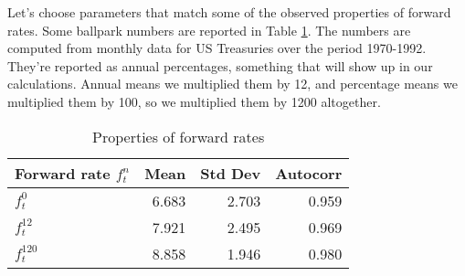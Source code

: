 \documentclass[11pt]{article}
\begin{document}
Let's choose parameters that match some of the observed
properties of forward rates.
Some ballpark numbers are reported in Table \ref{tab:forward-moments}.
The numbers are  computed from monthly data for US Treasuries
over the period 1970-1992.
They're reported as annual
percentages, something that will show up in our calculations.
Annual means we multiplied them by 12, and percentage means we multiplied them by 100,
so we multiplied them by 1200 altogether.

%
\begin{table}[h]
\centering
\caption{Properties of forward rates}
\begin{tabular}{lrrr}
\toprule
Forward rate $f^n_t$    &  Mean  &  Std Dev  &  Autocorr \\
\midrule
$f^0_t$                 &  6.683 & 2.703     &  0.959   \\
$f^{12}_t$              &  7.921 & 2.495     &  0.969   \\
$f^{120}_t$             &  8.858 & 1.946     &  0.980   \\
\bottomrule
\end{tabular}
\label{tab:forward-moments}
\end{table}
%
\end{document}
